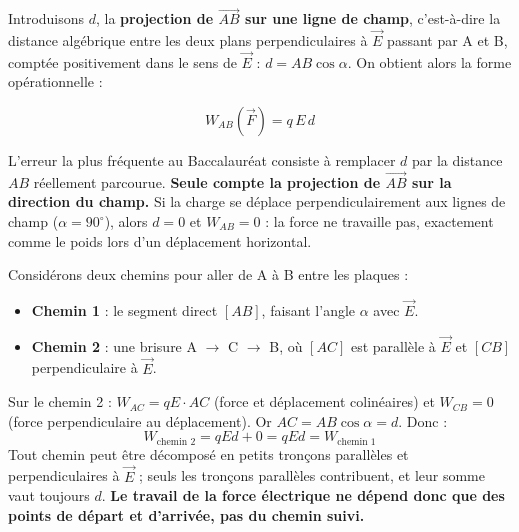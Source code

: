 \documentclass[11pt]{article}
\begin{document}
Introduisons $d$, la \textbf{projection de $\overrightarrow{AB}$ sur une ligne de champ}, c'est-à-dire la distance algébrique entre les deux plans perpendiculaires à $\vec{E}$ passant par A et B, comptée positivement dans le sens de $\vec{E}$ : $d = AB\cos\alpha$. On obtient alors la forme opérationnelle :

\[ W_{AB}(\vec{F}) = q\,E\,d \]

\begin{attention}
L'erreur la plus fréquente au Baccalauréat consiste à remplacer $d$ par la distance $AB$ réellement parcourue. \textbf{Seule compte la projection de $\overrightarrow{AB}$ sur la direction du champ.} Si la charge se déplace perpendiculairement aux lignes de champ ($\alpha = 90^\circ$), alors $d = 0$ et $W_{AB} = 0$ : la force ne travaille pas, exactement comme le poids lors d'un déplacement horizontal.
\end{attention}

\begin{experience}
Considérons deux chemins pour aller de A à B entre les plaques :
\begin{itemize}
\item \textbf{Chemin 1} : le segment direct $[AB]$, faisant l'angle $\alpha$ avec $\vec{E}$.
\item \textbf{Chemin 2} : une brisure A $\to$ C $\to$ B, où $[AC]$ est parallèle à $\vec{E}$ et $[CB]$ perpendiculaire à $\vec{E}$.
\end{itemize}
Sur le chemin 2 : $W_{AC} = qE \cdot AC$ (force et déplacement colinéaires) et $W_{CB} = 0$ (force perpendiculaire au déplacement). Or $AC = AB\cos\alpha = d$. Donc :
\[ W_{\text{chemin 2}} = qEd + 0 = qEd = W_{\text{chemin 1}} \]
Tout chemin peut être décomposé en petits tronçons parallèles et perpendiculaires à $\vec{E}$ ; seuls les tronçons parallèles contribuent, et leur somme vaut toujours $d$. \textbf{Le travail de la force électrique ne dépend donc que des points de départ et d'arrivée, pas du chemin suivi.}
\end{experience}
\end{document}

